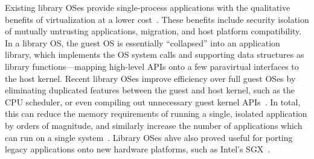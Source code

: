 Existing library OSes provide single-process applications
with the qualitative benefits of virtualization
at a lower cost~\citep{porter11drawbridge,unikernels,baumann13bascule}.
These benefits include security isolation of mutually untrusting applications,
migration, and host platform compatibility.
In a library OS, the guest OS is essentially ``collapsed''
into an application library,
which implements the OS system calls and supporting data structures as library functions---mapping
high-level APIs onto
a few paravirtual interfaces to the host kernel.
Recent library OSes improve efficiency over full guest OSes by eliminating duplicated features
between the guest and host kernel,
such as the CPU scheduler, or
even compiling out unnecessary guest kernel APIs~\citep{unikernels}.
In total, this can reduce the memory requirements of running a single, isolated application
by orders of magnitude, and similarly
increase the number of applications which can run
on a single system~\citep{porter11drawbridge,unikernels}.
Library OSes ahve also proved
useful for porting legacy applications
onto new hardware platforms, such as Intel's SGX~\citep{baumann14haven}.



